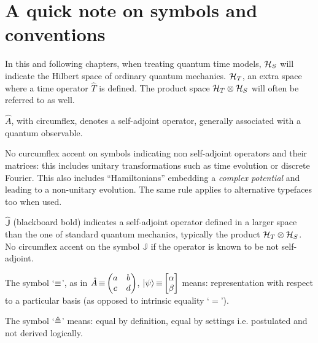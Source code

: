 \small

\section*{A quick note on symbols and conventions}

In this and following chapters, when treating quantum time models,
$\mathcal{H}_S$ will indicate the Hilbert space of ordinary quantum mechanics.
$\mathcal{H}_T$, an extra space where a time operator $\hat{T}$ is defined. The product space $\mathcal{H}_T \otimes \mathcal{H}_S$
will often be referred to as well.

$\hat{A}$, with circumflex, denotes a self-adjoint operator, generally associated with a quantum observable.

No curcumflex accent on symbols indicating non self-adjoint operators and their matrices:
this includes unitary transformations such as
time evolution or discrete Fourier.
This also includes ``Hamiltonians'' embedding a \emph{complex potential}
and leading to a non-unitary evolution. The same rule applies to alternative typefaces too when used.

$\hat{\mathbb{J}}$ (blackboard bold) indicates a self-adjoint operator defined in
a larger space than the one of standard quantum mechanics,
typically the product $\mathcal{H}_T \otimes \mathcal{H}_S$.
No circumflex accent on the symbol ${\mathbb{J}}$ if the operator is
known to be not self-adjoint.

The symbol `$\operatorname*{\equiv}$', as in $\hat{A} \repr \mqty(a&b\\c&d)$, $\ket{\psi} \repr \mqty[\alpha \\ \beta]$
means: representation with respect to a particular basis (as opposed to intrinsic equality `$=$').

The symbol `$\triangleq$'
means: equal by definition, equal by settings i.e. postulated and not derived logically.

\normalsize



